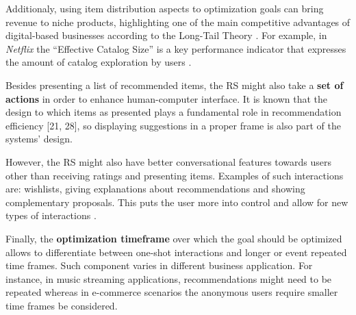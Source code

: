 
    Additionaly, using item distribution aspects to optimization goals can bring revenue to niche products, 
    highlighting one of the main competitive advantages of digital-based businesses according to the Long-Tail Theory \cite{2006LongTail}. 
    For example, in \textit{Netflix} the ``Effective Catalog Size'' is a key performance indicator that 
    expresses the amount of catalog exploration by users \cite{2016NetflixBusinessValue}.


    Besides presenting a list of recommended items, the RS might also take a \textbf{set of actions} in order 
    to enhance human-computer interface. It is known that the design to which items as presented plays 
    a fundamental role in recommendation efficiency [21, 28], so displaying suggestions in a proper 
    frame is also part of the systems' design. 
    
    However, the RS might also have better conversational 
    features towards users other than receiving ratings and presenting items. Examples of such 
    interactions are: wishlists, giving explanations 
    about recommendations and showing complementary proposals. This puts the user more into control and 
    allow for new types of interactions \cite{2016BeyondMatrixCompletion}.  

    Finally, the \textbf{optimization timeframe} over which the goal should be optimized allows to differentiate between 
    one-shot interactions and longer or event repeated time frames. Such component varies in
    different business application. For instance, in music streaming applications, recommendations might 
    need to be repeated whereas in e-commerce scenarios the anonymous users require smaller time frames 
    be considered. 



